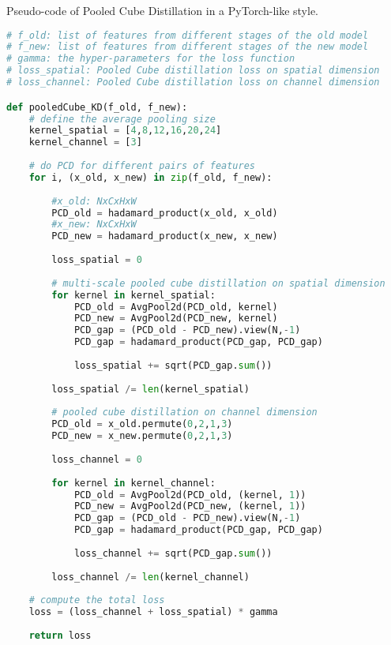 \documentclass[10pt,twocolumn,letterpaper]{article}
\makeatletter
\newcommand\algcomment[1]{\def\@algcomment{\footnotesize#1}}
\makeatother
\begin{document}
\begin{algorithm}[t]
\caption{Pseudo-code of Pooled Cube Distillation in a PyTorch-like style.}
\label{alg:code}
\algcomment{\fontsize{7.2pt}{0em}\selectfont \texttt{bmm}: batch matrix multiplication; \texttt{mm}: matrix multiplication; \texttt{cat}: concatenation.
}
\begin{lstlisting}[language=python]
# f_old: list of features from different stages of the old model
# f_new: list of features from different stages of the new model
# gamma: the hyper-parameters for the loss function
# loss_spatial: Pooled Cube distillation loss on spatial dimension
# loss_channel: Pooled Cube distillation loss on channel dimension

def pooledCube_KD(f_old, f_new):
    # define the average pooling size
    kernel_spatial = [4,8,12,16,20,24]
    kernel_channel = [3]
    
    # do PCD for different pairs of features
    for i, (x_old, x_new) in zip(f_old, f_new):
    
        #x_old: NxCxHxW
        PCD_old = hadamard_product(x_old, x_old) 
        #x_new: NxCxHxW
        PCD_new = hadamard_product(x_new, x_new) 
        
        loss_spatial = 0
        
        # multi-scale pooled cube distillation on spatial dimension
        for kernel in kernel_spatial:
            PCD_old = AvgPool2d(PCD_old, kernel)
            PCD_new = AvgPool2d(PCD_new, kernel)
            PCD_gap = (PCD_old - PCD_new).view(N,-1)
            PCD_gap = hadamard_product(PCD_gap, PCD_gap)
            
            loss_spatial += sqrt(PCD_gap.sum())
        
        loss_spatial /= len(kernel_spatial)
        
        # pooled cube distillation on channel dimension
        PCD_old = x_old.permute(0,2,1,3)
        PCD_new = x_new.permute(0,2,1,3)
        
        loss_channel = 0
        
        for kernel in kernel_channel:
            PCD_old = AvgPool2d(PCD_old, (kernel, 1))
            PCD_new = AvgPool2d(PCD_new, (kernel, 1))
            PCD_gap = (PCD_old - PCD_new).view(N,-1)
            PCD_gap = hadamard_product(PCD_gap, PCD_gap)
            
            loss_channel += sqrt(PCD_gap.sum())
        
        loss_channel /= len(kernel_channel)
        
    # compute the total loss
    loss = (loss_channel + loss_spatial) * gamma
    
    return loss

\end{lstlisting}
\end{algorithm}
\end{document}

